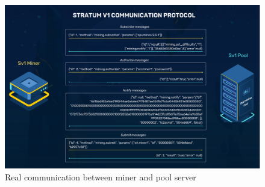 \begin{figure}[h!]
    \centering
    \includegraphics[width=15cm]{Figures/stratum/stratum2.png}
    \caption{Real communication between miner and pool server}
    \label{fig:stratum2}
\end{figure}